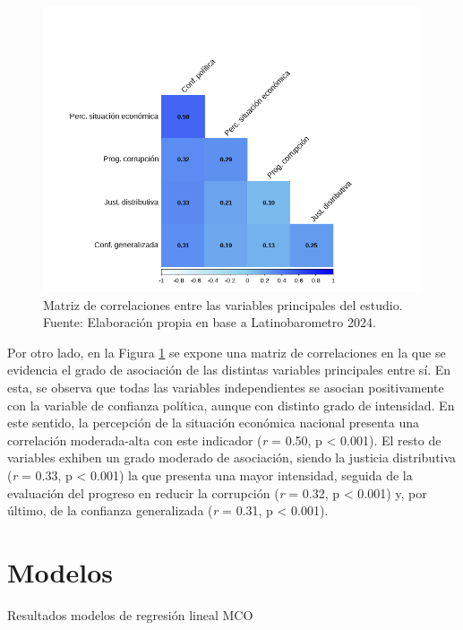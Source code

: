 \documentclass[12pt,twoside]{templates/facsothesis}
\begin{document}
\begin{figure}[!ht]

{\centering \includegraphics[width=1\linewidth,]{IPO/output/graphs/corrplot} 

}

\caption{Matriz de correlaciones entre las variables principales del estudio. Fuente: Elaboración propia en base a Latinobarometro 2024.}\label{fig:grafico-2}
\end{figure}

Por otro lado, en la Figura \ref{fig:grafico-2} se expone una matriz de correlaciones en la que se evidencia el grado de asociación de las distintas variables principales entre sí. En esta, se observa que todas las variables independientes se asocian positivamente con la variable de confianza política, aunque con distinto grado de intensidad. En este sentido, la percepción de la situación económica nacional presenta una correlación moderada-alta con este indicador (\emph{r} = 0.50, p \textless{} 0.001). El resto de variables exhiben un grado moderado de asociación, siendo la justicia distributiva (\emph{r} = 0.33, p \textless{} 0.001) la que presenta una mayor intensidad, seguida de la evaluación del progreso en reducir la corrupción (\emph{r} = 0.32, p \textless{} 0.001) y, por último, de la confianza generalizada (\emph{r} = 0.31, p \textless{} 0.001).

\section{Modelos}\label{modelos}

\label{tab:tabla-regresiones} Resultados modelos de regresión lineal MCO
\end{document}
